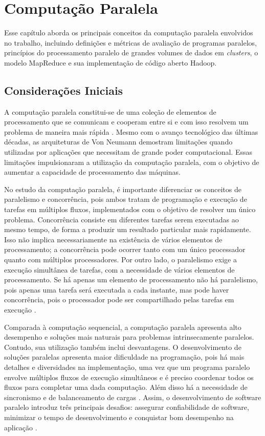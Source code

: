 \chapter{Computação Paralela}
\label{cap:referencial}

Esse capítulo aborda os principais conceitos da computação paralela envolvidos no trabalho, incluindo definições e métricas de avaliação de programas paralelos,
princípios do processamento paralelo de grandes volumes de dados em \textit{clusters}, o modelo MapReduce e sua implementação de código aberto Hadoop.


\section{Considerações Iniciais}
\label{sec:computacaoparalela}
A computação paralela constitui-se de uma coleção de elementos de processamento que se comunicam e cooperam entre si e com isso resolvem um problema de maneira mais rápida \cite{Almasi:1994}. Mesmo com o avanço tecnológico das últimas décadas, as arquiteturas de Von Neumann demostram limitações quando utilizadas por aplicações que necessitam de grande poder computacional. Essas limitações impulsionaram a utilização da computação paralela, com o objetivo de aumentar a capacidade de processamento das máquinas.

No estudo da computação paralela, é importante diferenciar os conceitos de paralelismo e concorrência, pois ambos tratam de programação e execução de tarefas em múltiplos fluxos, implementados com o objetivo de resolver um único problema. Concorrência consiste em diferentes tarefas serem executadas ao mesmo tempo, de forma a produzir um resultado particular mais rapidamente. Isso não implica necessariamente na existência de vários elementos de processamento; a concorrência pode ocorrer tanto com um único processador quanto com múltiplos processadores. 
Por outro lado, o paralelismo exige a execução simultânea de tarefas, com a necessidade de vários elementos de processamento. 
Se há apenas um elemento de processamento não há paralelismo, pois apenas uma tarefa será executada a cada instante, mas pode haver concorrência, pois o processador pode ser compartilhado pelas tarefas em execução \cite{Breshears:2009}.

Comparada à computação sequencial, a computação paralela apresenta alto desempenho e soluções mais naturais para problemas intrinsecamente paralelos. Contudo, sua utilização também inclui desvantagens. O desenvolvimento de soluções paralelas apresenta maior dificuldade na programação, pois há mais detalhes e diversidades na implementação, uma vez que um programa paralelo envolve múltiplos fluxos de execução simultâneos e é preciso coordenar todos os fluxos para completar uma dada computação. Além disso há a necessidade de sincronismo e de balanceamento de cargas \cite{Rauber:2010}. 	Assim, o desenvolvimento de software paralelo introduz três principais desafios: assegurar confiabilidade de software, minimizar o tempo de desenvolvimento e conquistar bom desempenho na aplicação \cite{Leiserson:2008}.

